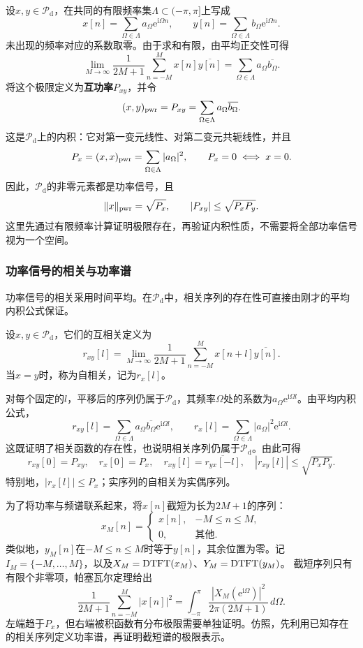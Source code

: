 设$x,y\in\mathcal{P}_{\mathrm d}$，在共同的有限频率集$\Lambda\subset(-\pi,\pi]$上写成
$$
    x[n]=\sum_{\Omega\in\Lambda}a_\Omega\mathrm{e}^{\mathrm{i}\Omega n},
    \qquad
    y[n]=\sum_{\Omega\in\Lambda}b_\Omega\mathrm{e}^{\mathrm{i}\Omega n}.
$$
未出现的频率对应的系数取零。由于求和有限，由平均正交性可得
$$
    \lim_{M\to\infty}\frac1{2M+1}\sum_{n=-M}^{M}x[n]\overline{y[n]}
    =\sum_{\Omega\in\Lambda}a_\Omega\overline{b_\Omega}.
$$
将这个极限定义为\textbf{互功率}$P_{xy}$，并令
$$
    (x,y)_{\operatorname{pwr}}=P_{xy}
    =\sum_{\Omega\in\Lambda}a_\Omega\overline{b_\Omega}.
$$
这是$\mathcal{P}_{\mathrm d}$上的内积：它对第一变元线性、对第二变元共轭线性，并且
$$
    P_x=(x,x)_{\operatorname{pwr}}=\sum_{\Omega\in\Lambda}|a_\Omega|^2,
    \qquad
    P_x=0\iff x=0.
$$
因此，$\mathcal{P}_{\mathrm d}$的非零元素都是功率信号，且
$$
    \|x\|_{\operatorname{pwr}}=\sqrt{P_x},\qquad |P_{xy}|\le\sqrt{P_xP_y}.
$$
这里先通过有限频率计算证明极限存在，再验证内积性质，不需要将全部功率信号视为一个空间。

\subsubsection{功率信号的相关与功率谱}

功率信号的相关采用时间平均。在$\mathcal{P}_{\mathrm d}$中，相关序列的存在性可直接由刚才的平均内积公式保证。

\begin{definition}[离散功率信号的相关]\label{def:discrete_correlation_power}
    设$x,y\in\mathcal{P}_{\mathrm d}$，它们的互相关定义为
    $$
        r_{xy}[l]=\lim_{M\to\infty}\frac1{2M+1}
        \sum_{n=-M}^{M}x[n+l]\overline{y[n]}.
    $$
    当$x=y$时，称为自相关，记为$r_x[l]$。
\end{definition}

对每个固定的$l$，平移后的序列仍属于$\mathcal{P}_{\mathrm d}$，其频率$\Omega$处的系数为$a_\Omega\mathrm{e}^{\mathrm{i}\Omega l}$。由平均内积公式，
$$
    r_{xy}[l]=\sum_{\Omega\in\Lambda}
    a_\Omega\overline{b_\Omega}\mathrm{e}^{\mathrm{i}\Omega l},
    \qquad
    r_x[l]=\sum_{\Omega\in\Lambda}|a_\Omega|^2\mathrm{e}^{\mathrm{i}\Omega l}.
$$
这既证明了相关函数的存在性，也说明相关序列仍属于$\mathcal{P}_{\mathrm d}$。由此可得
$$
    r_{xy}[0]=P_{xy},\quad r_x[0]=P_x,\quad
    r_{xy}[l]=\overline{r_{yx}[-l]},\quad
    |r_{xy}[l]|\le\sqrt{P_xP_y}.
$$
特别地，$|r_x[l]|\le P_x$；实序列的自相关为实偶序列。

为了将功率与频谱联系起来，将$x[n]$截短为长为$2M+1$的序列：
$$
    x_M[n]=
    \begin{cases}
        x[n], & -M\le n\le M, \\
        0,    & \text{其他}.
    \end{cases}
$$
类似地，$y_M[n]$在$-M\le n\le M$时等于$y[n]$，其余位置为零。记$I_M=\{-M,\ldots,M\}$，以及$X_M=\operatorname{DTFT}(x_M)$、$Y_M=\operatorname{DTFT}(y_M)$。
截短序列只有有限个非零项，帕塞瓦尔定理给出
$$
    \frac1{2M+1}\sum_{n=-M}^{M}|x[n]|^2
    =\int_{-\pi}^{\pi}
    \frac{|X_M(\mathrm{e}^{\mathrm{i}\Omega})|^2}{2\pi(2M+1)}\,d\Omega.
$$
左端趋于$P_x$，但右端被积函数有分布极限需要单独证明。仿照，先利用已知存在的相关序列定义功率谱，再证明截短谱的极限表示。

